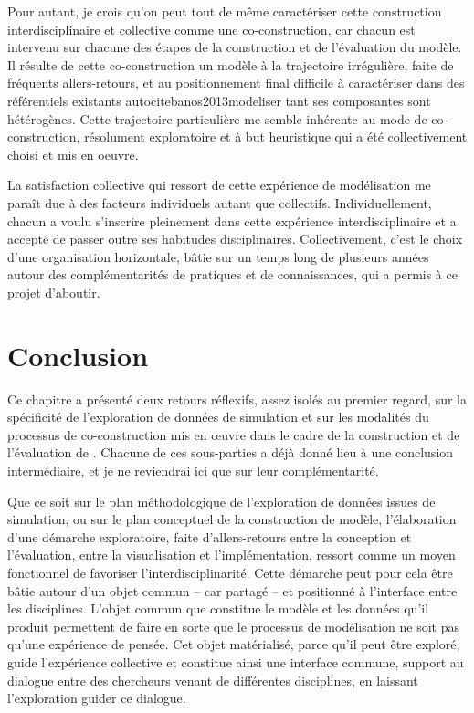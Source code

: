 Pour autant, je crois qu'on peut tout de même caractériser cette construction interdisciplinaire et collective comme une co-construction, car chacun est intervenu sur chacune des étapes de la construction et de l'évaluation du modèle.
Il résulte de cette co-construction un modèle à la trajectoire irrégulière, faite de fréquents allers-retours, et au positionnement final difficile à caractériser dans des référentiels existants autocite{banos2013modeliser} tant ses composantes sont hétérogènes.
Cette trajectoire particulière me semble inhérente au mode de co-construction, résolument exploratoire et à but heuristique qui a été collectivement choisi et mis en oeuvre.

La satisfaction collective qui ressort de cette expérience de modélisation me paraît due à des facteurs individuels autant que collectifs.
Individuellement, chacun a voulu s'inscrire pleinement dans cette expérience interdisciplinaire et a accepté de passer outre ses habitudes disciplinaires.
Collectivement, c'est le choix d'une organisation horizontale, bâtie sur un temps long de plusieurs années autour des complémentarités de pratiques et de connaissances, qui a permis à ce projet d'aboutir.

\section*{Conclusion}

Ce chapitre a présenté deux retours réflexifs, assez isolés au premier regard, sur la spécificité de l'exploration de données de simulation et sur les modalités du processus de co-construction mis en œuvre dans le cadre de la construction et de l'évaluation de \simfeodal{}.
Chacune de ces sous-parties a déjà donné lieu à une conclusion intermédiaire, et je ne reviendrai ici que sur leur complémentarité.

Que ce soit sur le plan méthodologique de l'exploration de données issues de simulation, ou sur le plan conceptuel de la construction de modèle, l'élaboration d'une démarche exploratoire, faite d'allers-retours entre la conception et l'évaluation, entre la visualisation et l'implémentation, ressort comme un moyen fonctionnel de favoriser l'interdisciplinarité.
Cette démarche peut pour cela être bâtie autour d'un objet commun -- car partagé -- et positionné à l'interface entre les disciplines.
L'objet commun que constitue le modèle et les données qu'il produit permettent de faire en sorte que le processus de modélisation ne soit pas qu'une expérience de pensée.
Cet objet matérialisé, parce qu'il peut être exploré, guide l'expérience collective et constitue ainsi une interface commune, support au dialogue entre des chercheurs venant de différentes disciplines, en laissant l'exploration guider ce dialogue.

